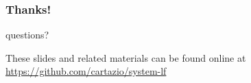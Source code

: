 \documentclass[11pt,reqno]{beamer}
\begin{document}
\begin{frame}\frametitle{Thanks!}
    questions?

These slides and related materials can be found online at
\url{https://github.com/cartazio/system-lf}

\end{frame}
%









\end{document}
